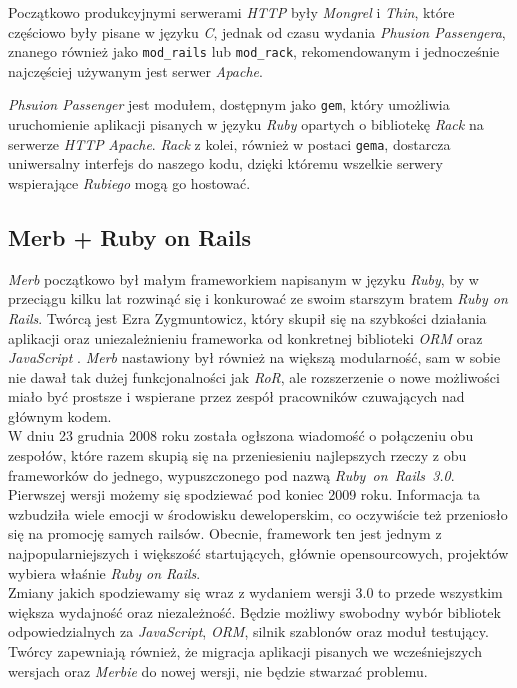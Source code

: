 \documentclass[12pt,twoside]{report}
\begin{document}
Początkowo produkcyjnymi serwerami \emph{HTTP} były \emph{Mongrel} i \emph{Thin}, które
częściowo były pisane w języku \emph{C}, jednak od czasu wydania \emph{Phusion Passengera},
znanego również jako \texttt{mod\_rails} lub \texttt{mod\_rack}, rekomendowanym i
jednocześnie najczęściej używanym jest serwer \emph{Apache}.


\emph{Phsuion Passenger} jest modułem, dostępnym jako \texttt{gem}, który umożliwia
uruchomienie aplikacji pisanych w języku \emph{Ruby} opartych o bibliotekę \emph{Rack} na
serwerze \emph{HTTP} \emph{Apache}. \emph{Rack} z kolei, również w postaci \texttt{gema},
dostarcza uniwersalny interfejs do naszego kodu, dzięki któremu wszelkie serwery
wspierające \emph{Rubiego} mogą go hostować.


\subsection{Merb + Ruby on Rails}
\emph{Merb} początkowo był małym frameworkiem napisanym w języku \emph{Ruby}, by w
przeciągu kilku lat rozwinąć się i konkurować ze swoim starszym bratem \emph{Ruby on
Rails}. Twórcą jest Ezra Zygmuntowicz, który skupił się na szybkości działania aplikacji
oraz uniezależnieniu frameworka od konkretnej biblioteki \emph{ORM} oraz \emph{JavaScript
}. \emph{Merb} nastawiony był również na większą modularność, sam w sobie nie dawał tak
dużej funkcjonalności jak \emph{RoR}, ale rozszerzenie o nowe możliwości miało być
prostsze i wspierane przez zespół pracowników czuwających nad głównym kodem.\\
W dniu 23 grudnia 2008 roku została ogłszona wiadomość \cite{rails-merb} o połączeniu obu zespołów,
które razem skupią się na przeniesieniu najlepszych rzeczy z obu frameworków do jednego,
wypuszczonego pod nazwą \emph{Ruby~on~Rails~3.0}. Pierwszej wersji możemy się spodziewać
pod koniec 2009 roku. Informacja ta wzbudziła wiele emocji w środowisku deweloperskim, co
oczywiście też przeniosło się na promocję samych railsów. Obecnie, framework ten jest
jednym z najpopularniejszych i większość startujących, głównie opensourcowych,
projektów wybiera właśnie \emph{Ruby on Rails}.\\
Zmiany jakich spodziewamy się wraz z wydaniem wersji 3.0 to przede wszystkim większa
wydajność oraz niezależność. Będzie możliwy swobodny wybór bibliotek odpowiedzialnych za
\emph{JavaScript}, \emph{ORM}, silnik szablonów oraz moduł testujący. Twórcy zapewniają
również, że migracja aplikacji pisanych we wcześniejszych wersjach oraz \emph{Merbie} do nowej
wersji, nie będzie stwarzać problemu.
\end{document}
